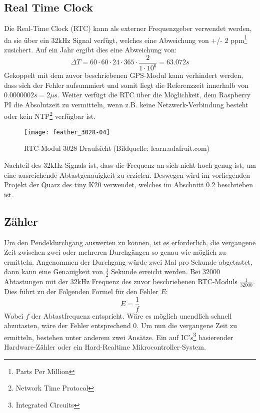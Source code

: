 \subsection{Real Time Clock}
\label{cap:RTC}
	Die Real-Time Clock (RTC) kann als externer Frequenzgeber verwendet werden, da sie über ein 32kHz Signal verfügt, welches eine Abweichung von +/- 2 ppm\footnote{Parts Per Million} zusichert. Auf ein Jahr ergibt dies eine Abweichung von:
	\[
		\Delta{T} = 60 \cdot 60 \cdot 24 \cdot 365 \cdot \frac{2}{1\cdot 10^6} = 63.072s
	\]
	Gekoppelt mit dem zuvor beschriebenen GPS-Modul kann verhindert werden, dass sich der Fehler aufsummiert und somit liegt die Referenzzeit innerhalb von $0.0000002s = 2\mu{s}$. 
	Weiter verfügt die RTC über die Möglichkeit, dem Raspberry PI die Absolutzeit zu vermitteln, wenn z.B. keine Netzwerk-Verbindung besteht oder kein NTP\footnote{Network Time Protocol} verfügbar ist.
		\begin{figure}[H]
        	\centering
        	\texttt{[image: feather\_3028-04]}
        	\caption{RTC-Modul 3028 Draufsicht (Bildquelle: learn.adafruit.com)}
        	\label{fig:RTC3028}
    	\end{figure}
Nachteil des 32kHz Signals ist, dass die Frequenz an sich nicht hoch genug ist, um eine ausreichende Abtastgenauigkeit zu erzielen.
Deswegen wird im vorliegenden Projekt der Quarz des tiny K20 verwendet, welches im Abschnitt \ref{cap:counter} beschrieben ist.
%
%
\subsection{Zähler}
\label{cap:counter}
	Um den Pendeldurchgang auswerten zu können, ist es erforderlich, die vergangene Zeit zwischen zwei oder mehreren Durchgängen so genau wie möglich zu ermitteln. Angenommen der Durchgang würde zwei Mal pro Sekunde abgetastet, dann kann eine Genauigkeit von $\frac{1}{2}$ Sekunde erreicht werden. Bei 32000 Abtastungen mit der 32kHz Frequenz des zuvor beschriebenen RTC-Moduls $\frac{1}{32000}$. Dies führt zu der Folgenden Formel für den Fehler $E$:
	\[
		E = \frac{1}{f}
	\]
	Wobei $f$ der Abtastfrequenz entspricht. Wäre es möglich unendlich schnell abzutasten, wäre der Fehler entsprechend 0. Um nun die vergangene Zeit zu ermitteln, bestehen unter anderem zwei Ansätze. Ein auf IC's\footnote{Integrated Circuits} basierender Hardware-Zähler oder ein Hard-Realtime Mikrocontroller-System.
